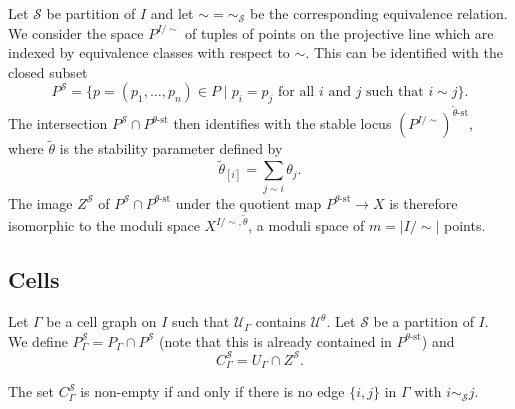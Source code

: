 \documentclass[11pt, a4paper]{amsart}
\begin{document}
	Let \(\mathcal{S}\) be partition of \(I\) and let \({\sim} = {\sim}_\mathcal{S}\) be the corresponding equivalence relation. 
	We consider the space \(P^{I/\sim}\) of tuples of points on the projective line which are indexed by equivalence classes with respect to \(\sim\). 
	This can be identified with the closed subset 
	\[
		P^\mathcal{S} = \{ p = (p_1,\ldots,p_n) \in P \mid p_i = p_j \text{ for all \(i\) and \(j\) such that } i \sim j \}. 
	\]
	The intersection \(P^\mathcal{S} \cap P^{\theta\text{-st}}\) then identifies with the stable locus \({(P^{I/\sim})}^{\tilde{\theta}\text{-st}}\), where \(\tilde{\theta}\) is the stability parameter defined by
	\[
		\tilde{\theta}_{[i]} = \sum_{j \sim i} \theta_j.
	\]
	The image \(Z^\mathcal{S}\) of \(P^\mathcal{S} \cap P^{\theta\text{-st}}\) under the quotient map \(P^{\theta\text{-st}} \to X\) is therefore isomorphic to the moduli space \(X^{I/\sim,\tilde{\theta}}\), a moduli space of \(m = \left|I/\sim\right|\) points.

	\subsection*{Cells}

	Let \(\Gamma\) be a cell graph on \(I\) such that \(\mathcal{U}_\Gamma\) contains \(\mathcal{U}^\theta\). Let \(\mathcal{S}\) be a partition of \(I\). We define \(P_{\Gamma}^\mathcal{S} = P_{\Gamma} \cap P^\mathcal{S}\) (note that this is already contained in \(P^{\theta\text{-st}}\)) and 
	\[
		C_\Gamma^\mathcal{S} = U_\Gamma \cap Z^\mathcal{S}.
	\]

	\begin{lem}
		The set $C_\Gamma^\mathcal{S}$ is non-empty if and only if there is no edge \(\{i,j\}\) in \(\Gamma\) with \(i \sim_\mathcal{S} j\).
	\end{lem}
\end{document}

